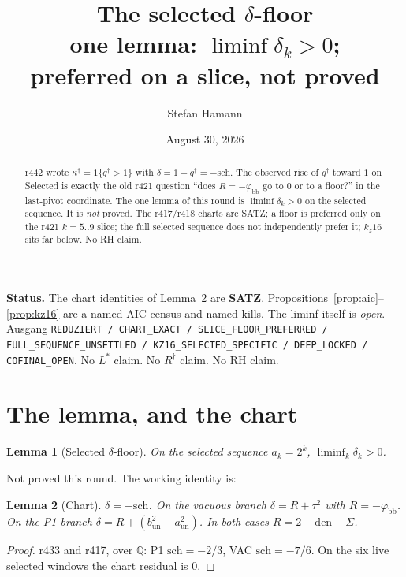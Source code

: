 \documentclass[11pt]{article}
\title{\bfseries The selected $\delta$-floor\\[2mm]
\large one lemma: $\liminf\delta_k>0$;\\
preferred on a slice, not proved}
\author{Stefan Hamann}
\date{August 30, 2026}
\newtheorem{lemma}{Lemma}
\newcommand{\qd}{q^{\dagger}}
\newcommand{\kapd}{\kappa^{\dagger}}
\newcommand{\phibb}{\varphi_{\mathrm{bb}}}
\begin{document}
\maketitle

\begin{abstract}\noindent
r442 wrote $\kapd=1\{\qd>1\}$ with
$\delta=1-\qd=-\mathrm{sch}$.
The observed rise of $\qd$ toward $1$ on Selected
is exactly the old r421 question
``does $R=-\phibb$ go to $0$ or to a floor?''
in the last-pivot coordinate.
The one lemma of this round is
$\liminf\delta_k>0$ on the selected sequence.
It is \emph{not} proved.
The r417/r418 charts are SATZ; a floor is preferred
only on the r421 $k=5..9$ slice; the full selected
sequence does not independently prefer it;
$k_z16$ sits far below.
No RH claim.
\end{abstract}

\medskip\noindent
\textbf{Status.}\enspace
The chart identities of Lemma~\ref{lem:chart} are
\textbf{SATZ}.
Propositions~\ref{prop:aic}--\ref{prop:kz16} are a
named AIC census and named kills.
The liminf itself is \emph{open}.
Ausgang
\texttt{REDUZIERT / CHART\_EXACT / SLICE\_FLOOR\_PREFERRED / FULL\_SEQUENCE\_UNSETTLED / KZ16\_SELECTED\_SPECIFIC / DEEP\_LOCKED / COFINAL\_OPEN}.
No $L^{*}$ claim.  No $R^{\dagger}$ claim.  No RH claim.

\section{The lemma, and the chart}\label{sec:lemma}

\begin{lemma}[Selected $\delta$-floor]\label{lem:floor}
On the selected sequence $a_k=2^k$,
$\liminf_k\delta_k>0$.
\end{lemma}

\noindent
Not proved this round.  The working identity is:

\begin{lemma}[Chart]\label{lem:chart}
$\delta=-\mathrm{sch}$.
On the vacuous branch
$\delta=R+\tau^{2}$ with $R=-\phibb$.
On the P1 branch
$\delta=R+(b_{\mathrm{un}}^{2}-a_{\mathrm{un}}^{2})$.
In both cases $R=2-\mathrm{den}-\Sigma$.
\end{lemma}

\begin{proof}
r433 and r417, over $\mathbb{Q}$:
P1 $\mathrm{sch}=-2/3$, VAC $\mathrm{sch}=-7/6$.
On the six live selected windows the chart residual
is $0$.
\end{proof}
\end{document}
